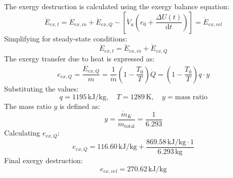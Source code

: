 The exergy destruction is calculated using the exergy balance equation:  
\[
\dot{E}_{ex,t} = \dot{E}_{ex,in} + \dot{E}_{ex,Q} - \left[ \dot{V}_u \left( e_0 + \frac{\Delta U(t)}{\text{d}t} \right) \right] = \dot{E}_{ex,vel}
\]  
Simplifying for steady-state conditions:  
\[
\dot{E}_{ex,t} = \dot{E}_{ex,in} + \dot{E}_{ex,Q}
\]  
The exergy transfer due to heat is expressed as:  
\[
e_{ex,Q} = \frac{\dot{E}_{ex,Q}}{\dot{m}} = \frac{1}{\dot{m}} \left( 1 - \frac{T_0}{T} \right) \dot{Q} = \left( 1 - \frac{T_0}{T} \right) q \cdot y
\]  
Substituting the values:  
\[
q = 1195 \, \text{kJ/kg}, \quad T = 1289 \, \text{K}, \quad y = \text{mass ratio}
\]  
The mass ratio \( y \) is defined as:  
\[
y = \frac{\dot{m}_K}{\dot{m}_\text{total}} = \frac{1}{6.293}
\]  
Calculating \( e_{ex,Q} \):  
\[
e_{ex,Q} = 116.60 \, \text{kJ/kg} + \frac{869.58 \, \text{kJ/kg} \cdot 1}{6.293 \, \text{kg}}
\]  
Final exergy destruction:  
\[
e_{ex,vel} = 270.62 \, \text{kJ/kg}
\]
